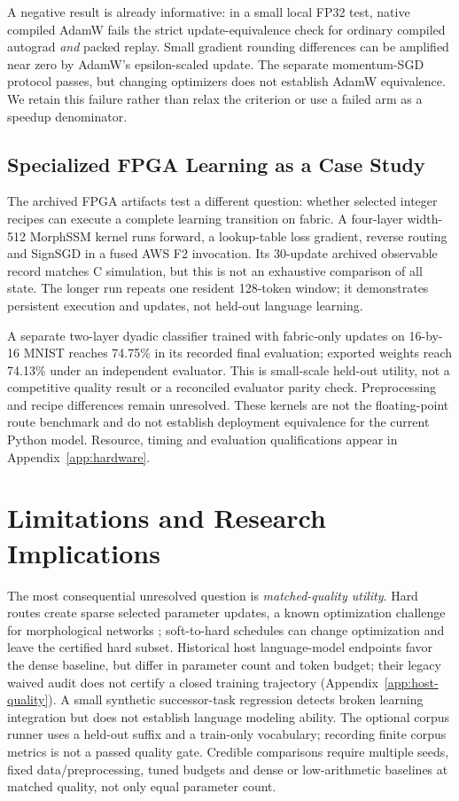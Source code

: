 \documentclass{article}
\theoremstyle{plain}
\theoremstyle{definition}
\theoremstyle{remark}
\begin{document}
A negative result is already informative: in a small local FP32 test,
native compiled AdamW fails the strict update-equivalence check for
ordinary compiled autograd \emph{and} packed replay. Small gradient rounding
differences can be amplified near zero by AdamW's epsilon-scaled update.
The separate momentum-SGD protocol passes, but changing optimizers does not
establish AdamW equivalence. We retain this failure rather than relax the
criterion or use a failed arm as a speedup denominator.

\subsection{Specialized FPGA Learning as a Case Study}

The archived FPGA artifacts test a different question: whether selected
integer recipes can execute a complete learning transition on fabric.
A four-layer width-512 MorphSSM kernel runs forward, a lookup-table loss
gradient, reverse routing and SignSGD \citep{bernstein2018signsgd} in a fused AWS F2 invocation.
Its 30-update archived observable record matches C simulation, but this is
not an exhaustive comparison of all state. The longer run repeats one
resident 128-token window; it demonstrates persistent execution and updates,
not held-out language learning.

A separate two-layer dyadic classifier trained with fabric-only updates on
16-by-16 MNIST reaches 74.75\% in its recorded final evaluation; exported
weights reach 74.13\% under an independent evaluator. This is small-scale
held-out utility, not a competitive quality result or a reconciled evaluator
parity check. Preprocessing and recipe differences remain unresolved.
These kernels are not the floating-point route benchmark and do not
establish deployment equivalence for the current Python model. Resource,
timing and evaluation qualifications appear in Appendix~\ref{app:hardware}.

\section{Limitations and Research Implications}

The most consequential unresolved question is \emph{matched-quality utility}.
Hard routes create sparse selected parameter updates, a known optimization
challenge for morphological networks \citep{fotopoulos2025training}; soft-to-hard schedules
can change optimization and leave the certified hard subset. Historical
host language-model endpoints favor the dense baseline, but differ in
parameter count and token budget; their legacy waived audit does not
certify a closed training trajectory (Appendix~\ref{app:host-quality}). A small
synthetic successor-task regression detects broken learning integration but
does not establish language modeling ability. The optional corpus runner
uses a held-out suffix and a train-only vocabulary; recording finite corpus
metrics is not a passed quality gate. Credible comparisons require multiple
seeds, fixed data/preprocessing, tuned budgets and dense or low-arithmetic
baselines at matched quality, not only equal parameter count.
\end{document}
